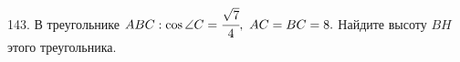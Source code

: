 143. В треугольнике $ABC: \cos \angle C=\cfrac{\sqrt{7}}{4},\ AC=BC=8.$ Найдите высоту $BH$ этого треугольника.\\
